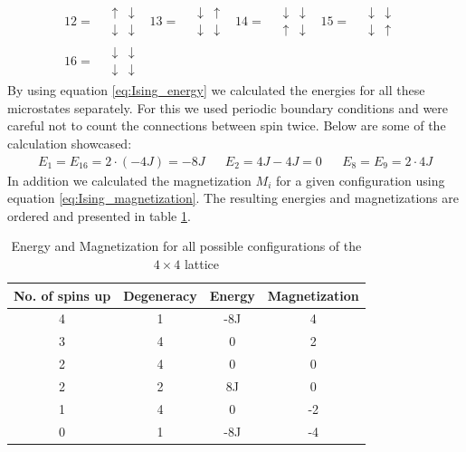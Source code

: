 \documentclass[%
 reprint,
nofootinbib,
aps,
]{revtex4-1}
\begin{document}
\begin{align*}
12=\ &\begin{matrix}\uparrow&\downarrow\\\downarrow&\downarrow \end{matrix}&
13=\ &\begin{matrix}\downarrow&\uparrow\\\downarrow&\downarrow \end{matrix}&
14=\ &\begin{matrix}\downarrow&\downarrow\\\uparrow&\downarrow \end{matrix}&
15=\ &\begin{matrix}\downarrow&\downarrow\\\downarrow&\uparrow \end{matrix}&\\
16=\ &\begin{matrix}\downarrow&\downarrow\\\downarrow&\downarrow \end{matrix}&
\end{align*}
By using equation \ref{eq:Ising_energy} we calculated the energies for all these microstates separately. For this we used periodic boundary conditions and were careful not to count the connections between spin twice. Below are some of the calculation showcased:
\begin{align*}
    &E_1 = E_{16} = 2 \cdot (-4J) = -8J& &E_2 = 4J - 4J = 0& &E_8 = E_9 = 2 \cdot 4J&
\end{align*}
In addition we calculated the magnetization $M_i$ for a given configuration using equation \ref{eq:Ising_magnetization}. The resulting energies and magnetizations are ordered and presented in table \ref{tab:2x2_EM}.
\begin{table}[H]
  \begin{center}
  \caption{Energy and Magnetization for all possible configurations of the $4\times 4$ lattice}
  \begin{tabular}{|c|c|c|c|} \hline
  \textbf{No. of spins up} & \textbf{Degeneracy} & \textbf{Energy} & \textbf{Magnetization} \\ \hline
  4 & 1 & -8J & 4 \\ \hline
  3 & 4 & 0 & 2 \\ \hline
  2 & 4 & 0 & 0 \\ \hline
  2 & 2 & 8J & 0 \\ \hline
  1 & 4 & 0 & -2 \\ \hline
  0 & 1 & -8J & -4 \\ \hline
  \end{tabular}
  \label{tab:2x2_EM}
  \end{center}
\end{table}
\end{document}
